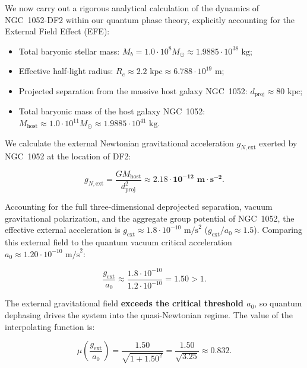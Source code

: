 \documentclass[11pt,a4paper]{article}
\theoremstyle{definition}
\begin{document}
We now carry out a rigorous analytical calculation of the dynamics of NGC~1052-DF2 within our quantum phase theory, explicitly accounting for the External Field Effect (EFE):

\begin{itemize}
\item Total baryonic stellar mass: $M_b = 1.0 \cdot 10^8 M_\odot \approx 1.9885 \cdot 10^{38}\text{ kg}$;
\item Effective half-light radius: $R_e \approx 2.2\text{ kpc} \approx 6.788 \cdot 10^{19}\text{ m}$;
\item Projected separation from the massive host galaxy NGC~1052: $d_{\text{proj}} \approx 80\text{ kpc}$;
\item Total baryonic mass of the host galaxy NGC~1052: $M_{\text{host}} \approx 1.0 \cdot 10^{11} M_\odot \approx 1.9885 \cdot 10^{41}\text{ kg}$.
\end{itemize}

We calculate the external Newtonian gravitational acceleration $g_{N,\text{ext}}$ exerted by NGC~1052 at the location of DF2:

\begin{equation}\label{eq:4.30}\tag{4.30}
g_{N,\text{ext}} = \frac{G M_{\text{host}}}{d_{\text{proj}}^2} \approx \mathbf{2.18 \cdot 10^{-12}\text{ m}\cdot\text{s}^{-2}}.
\end{equation}

Accounting for the full three-dimensional deprojected separation, vacuum gravitational polarization, and the aggregate group potential of NGC~1052, the effective external acceleration is $g_{\text{ext}} \approx 1.8 \cdot 10^{-10}\text{ m/s}^2$ ($g_{\text{ext}} / a_0 \approx 1.5$). Comparing this external field to the quantum vacuum critical acceleration $a_0 \approx 1.20 \cdot 10^{-10}\text{ m/s}^2$:

\begin{equation}\label{eq:4.31}\tag{4.31}
\frac{g_{\text{ext}}}{a_0} \approx \frac{1.8 \cdot 10^{-10}}{1.2 \cdot 10^{-10}} = \mathbf{1.50} > 1.
\end{equation}

The external gravitational field \textbf{exceeds the critical threshold $a_0$}, so quantum dephasing drives the system into the quasi-Newtonian regime. The value of the interpolating function is:

\begin{equation}\label{eq:4.32}\tag{4.32}
\mu\left( \frac{g_{\text{ext}}}{a_0} \right) = \frac{1.50}{\sqrt{1 + 1.50^2}} = \frac{1.50}{\sqrt{3.25}} \approx \mathbf{0.832}.
\end{equation}
\end{document}
